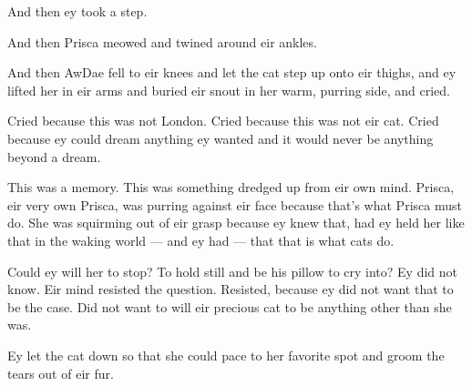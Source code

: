 And then ey took a step.

And then Prisca meowed and twined around eir ankles.

And then AwDae fell to eir knees and let the cat step up onto eir thighs, and ey lifted her in eir arms and buried eir snout in her warm, purring side, and cried.

Cried because this was not London. Cried because this was not eir cat. Cried because ey could dream anything ey wanted and it would never be anything beyond a dream.

This was a memory. This was something dredged up from eir own mind. Prisca, eir very own Prisca, was purring against eir face because that's what Prisca must do. She was squirming out of eir grasp because ey knew that, had ey held her like that in the waking world — and ey had — that that is what cats do.

Could ey will her to stop? To hold still and be his pillow to cry into? Ey did not know. Eir mind resisted the question. Resisted, because ey did not want that to be the case. Did not want to will eir precious cat to be anything other than she was.

Ey let the cat down so that she could pace to her favorite spot and groom the tears out of eir fur.
